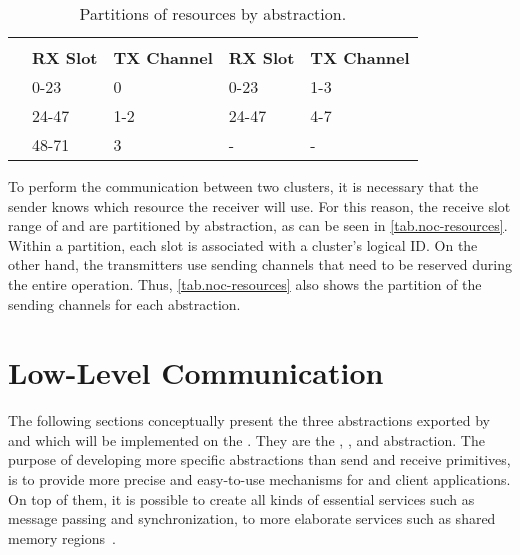 		\begin{table}[!tb]
			\centering%
			\caption{Partitions of \noc resources by abstraction.}%
			\label{tab.noc-resources}%

			\begin{tabular}{l|l|l|l|l|}
				\cline{2-5}
														& \multicolumn{2}{c|}{\textbf{\cnoc}}    & \multicolumn{2}{c|}{\textbf{\dnoc}}    \\ \cline{2-5}
														& \textbf{RX Slot} & \textbf{TX Channel} & \textbf{RX Slot} & \textbf{TX Channel} \\ \hline
				\multicolumn{1}{|l|}{\textbf{\mailbox}} & 0-23             & 0                   & 0-23             & 1-3                 \\ \hline
				\multicolumn{1}{|l|}{\textbf{\portal}}  & 24-47            & 1-2                 & 24-47            & 4-7                 \\ \hline
				\multicolumn{1}{|l|}{\textbf{\sync}}    & 48-71            & 3                   & -                & -                   \\ \hline
			\end{tabular}

		\end{table}

		To perform the communication between two clusters, it is necessary that the
		sender knows which resource the receiver will use.
		For this reason, the receive slot range of \cnoc and \dnoc are partitioned
		by abstraction, as can be seen in \autoref{tab.noc-resources}.
		Within a partition, each slot is associated with a cluster's logical ID.
		On the other hand, the transmitters use sending channels that need to
		be reserved during the entire operation.
		Thus, \autoref{tab.noc-resources} also shows the partition of the
		sending channels for each abstraction.

	\section{Low-Level Communication}
	\label{sec.low-level-comm}

		The following sections conceptually present the three abstractions
		exported by \hal and which will be implemented on the \mppa.
		They are the \sync, \mailbox, and \portal abstraction.
		The purpose of developing more specific abstractions than
		send and receive primitives, is to provide more precise and easy-to-use
		mechanisms for \os and client applications.
		On top of them, it is possible to create all kinds of essential
		services such as message passing and synchronization,
		to more elaborate services such as shared memory regions~\cite{penna:rmen}.

